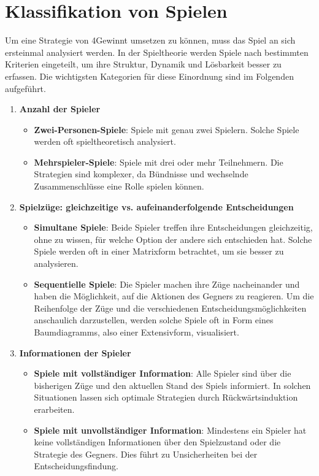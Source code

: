 \section{Klassifikation von Spielen}
Um eine Strategie von 4Gewinnt umsetzen zu können, muss das Spiel an sich ersteinmal analysiert werden. In der Spieltheorie werden Spiele nach bestimmten Kriterien eingeteilt, um ihre Struktur, Dynamik und Lösbarkeit besser zu erfassen. Die wichtigsten Kategorien für diese Einordnung sind im Folgenden aufgeführt.
\begin{enumerate}
	\item \textbf{Anzahl der Spieler}
	\begin{itemize}
		\item \textbf{Zwei-Personen-Spiele}: Spiele mit genau zwei Spielern. Solche Spiele werden oft spieltheoretisch analysiert.
		\item \textbf{Mehrspieler-Spiele}: Spiele mit drei oder mehr Teilnehmern. Die Strategien sind komplexer, da Bündnisse und wechselnde Zusammenschlüsse eine Rolle spielen können.
	\end{itemize}
	
	\item \textbf{Spielzüge: gleichzeitige vs. aufeinanderfolgende Entscheidungen}
	\begin{itemize}
		\item \textbf{Simultane Spiele}: Beide Spieler treffen ihre Entscheidungen gleichzeitig, ohne zu wissen, für welche Option der andere sich entschieden hat. Solche Spiele werden oft in einer Matrixform betrachtet, um sie besser zu analysieren.
		\item \textbf{Sequentielle Spiele}: Die Spieler machen ihre Züge nacheinander und haben die Möglichkeit, auf die Aktionen des Gegners zu reagieren. Um die Reihenfolge der Züge und die verschiedenen Entscheidungsmöglichkeiten anschaulich darzustellen, werden solche Spiele oft in Form eines Baumdiagramms, also einer Extensivform, visualisiert.
	\end{itemize}
	
	\item \textbf{Informationen der Spieler}
	\begin{itemize}
		\item \textbf{Spiele mit vollständiger Information}: Alle Spieler sind über die bisherigen Züge und den aktuellen Stand des Spiels informiert. In solchen Situationen lassen sich optimale Strategien durch Rückwärtsinduktion erarbeiten.
		\item \textbf{Spiele mit unvollständiger Information}: Mindestens ein Spieler hat keine vollständigen Informationen über den Spielzustand oder die Strategie des Gegners. Dies führt zu Unsicherheiten bei der Entscheidungsfindung.
	\end{itemize}
	

\end{enumerate}
